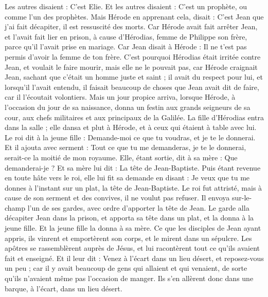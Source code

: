 \begin{multicols}{2}
Les autres disaient : C'est Elie. Et les autres disaient : C'est un prophète, ou comme l’un des prophètes.
Mais Hérode en apprenant cela, disait : C'est Jean que j'ai fait décapiter, il est ressuscité des morts.
Car Hérode avait fait arrêter Jean, et l'avait fait lier en prison, à cause d'Hérodias, femme de Philippe son frère, parce qu'il l'avait prise en mariage.
Car Jean disait à Hérode : Il ne t'est pas permis d'avoir la femme de ton frère.
C'est pourquoi Hérodias était irritée contre Jean, et voulait le faire mourir, mais elle ne le pouvait pas,
car Hérode craignait Jean, sachant que c'était un homme juste et saint ; il avait du respect pour lui, et lorsqu’il l’avait entendu, il faisait beaucoup de choses que Jean avait dit de faire, car il l’écoutait volontiers.
 Mais un jour propice arriva, lorsque Hérode, à l’occasion du jour de sa naissance, donna un festin aux grands seigneurs de sa cour, aux chefs militaires et aux principaux de la Galilée.
La fille d'Hérodias entra dans la salle ; elle dansa et plut à Hérode, et à ceux qui étaient à table avec lui. Le roi dit à la jeune fille : Demande-moi ce que tu voudras, et je te le donnerai.
Et il ajouta avec serment : Tout ce que tu me demanderas, je te le donnerai, serait-ce la moitié de mon royaume.
Elle, étant sortie, dit à sa mère : Que demanderai-je ? Et sa mère lui dit : La tête de Jean-Baptiste.
Puis étant revenue en toute hâte vers le roi, elle lui fit sa demande en disant : Je veux que tu me donnes à l’instant sur un plat, la tête de Jean-Baptiste.
Le roi fut attristé, mais à cause de son serment et des convives, il ne voulut pas refuser.
Il envoya sur-le-champ l’un de ses gardes, avec ordre d'apporter la tête de Jean.
Le garde alla décapiter Jean dans la prison, et apporta sa tête dans un plat, et la donna à la jeune fille. Et la jeune fille la donna à sa mère.
Ce que les disciples de Jean ayant appris, ils vinrent et emportèrent son corps, et le mirent dans un sépulcre.
Les apôtres se rassemblèrent auprès de Jésus, et lui racontèrent tout ce qu'ils avaient fait et enseigné.
Et il leur dit : Venez à l'écart dans un lieu désert, et reposez-vous un peu ; car il y avait beaucoup de gens qui allaient et qui venaient, de sorte qu'ils n'avaient même pas l'occasion de manger.
Ils s'en allèrent donc dans une barque, à l’écart, dans un lieu désert.

\end{multicols}
